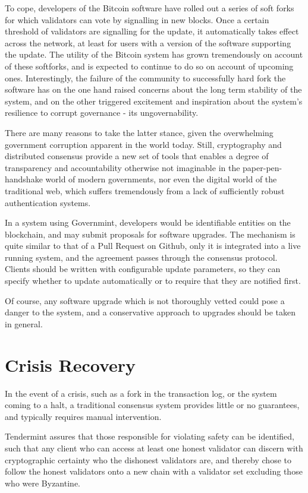 To cope, developers of the Bitcoin software have rolled out a series of soft forks for which validators can vote by signalling in new blocks. 
Once a certain threshold of validators are signalling for the update,
it automatically takes effect across the network, at least for users with a version of the software supporting the update.
The utility of the Bitcoin system has grown tremendously on account of these softforks, 
and is expected to continue to do so on account of upcoming ones.
Interestingly, the failure of the community to successfully hard fork the software has
on the one hand raised concerns about the long term stability of the system,
and on the other triggered excitement and inspiration about the system's resilience to corrupt governance - its ungovernability.

There are many reasons to take the latter stance, 
given the overwhelming government corruption apparent in the world today.
Still, cryptography and distributed consensus provide a new set of tools that enables a degree
of transparency and accountability otherwise not imaginable in the paper-pen-handshake world of modern governments,
nor even the digital world of the traditional web, which suffers tremendously from a lack of sufficiently robust authentication systems.

In a system using Governmint, developers would be identifiable entities on the blockchain,
and may submit proposals for software upgrades. 
The mechanism is quite similar to that of a Pull Request on Github, 
only it is integrated into a live running system,
and the agreement passes through the consensus protocol.
Clients should be written with configurable update parameters, 
so they can specify whether to update automatically or to require that they are notified first.

Of course, any software upgrade which is not thoroughly vetted could pose a danger to the system,
and a conservative approach to upgrades should be taken in general.

\section{Crisis Recovery}

In the event of a crisis, such as a fork in the transaction log,
or the system coming to a halt, 
a traditional consensus system provides little or no guarantees,
and typically requires manual intervention.

Tendermint assures that those responsible for violating safety can be identified,
such that any client who can access at least one honest validator 
can discern with cryptographic certainty who the dishonest validators are,
and thereby chose to follow the honest validators onto a new chain with a validator set excluding those who were Byzantine.


